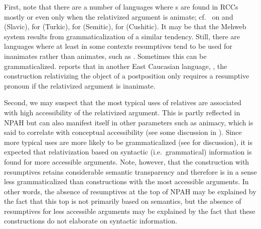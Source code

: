 ﻿\documentclass[output=paper]{langsci/langscibook}
\begin{document}
First, note that there are a number of languages where s are found in RCCs mostly or even only when the relativized
argument is animate; cf.\ \citet{bošković2009} on  and 
(Slavic), \citet{csató-uchturpani2010} for  (Turkic),
\citet[104–105]{erteschik-shir1992} for  (Semitic), \citet{kawachi2007} for 
(Cushitic). It may be that the Mehweb system results from
grammaticalization of a similar tendency. Still, there are languages
where at least in some contexts resumptives tend to be used for
inanimates rather than animates, such as  \citep{alzaghir2013}.
Sometimes this can be grammaticalized. \citet[474–475]{lyutikova1999}
reports that in another East Caucasian language, , the
construction relativizing the object of a postposition only requires a
resumptive pronoun if the relativized argument is inanimate.

Second, we may suspect that the most typical uses of relatives are
associated with high accessibility of the relativized argument. This is
partly reflected in NPAH but can also manifest itself in other
parameters such as animacy, which is said to correlate with conceptual
accessibility (see some discussion in \citealt{vannice-dietrich2003}). Since
more typical uses are more likely to be grammaticalized (see \citealt{lander2015}
for discussion), it is expected that relativization based on syntactic
(i.e.\ grammatical) information is found for more accessible arguments.
Note, however, that the construction with resumptives retains
considerable semantic transparency \citep{keenan1975} and therefore is in a
sense less grammaticalized than constructions with the most accessible
arguments. In other words, the absence of resumptives at the top of NPAH
may be explained by the fact that this top is not primarily based on semantics,
but the absence of resumptives for less accessible arguments may be
explained by the fact that these constructions do not elaborate on
syntactic information.
\end{document}
